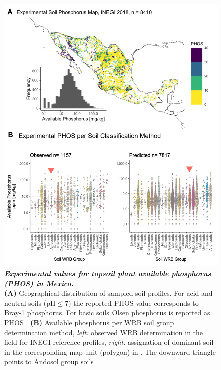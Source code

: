\begin{figure}[!ht]
\centering
\includegraphics[width=0.9\linewidth]{Chapter-2/figs/obeserved_PHOS.png}
\caption[Experimental values for topsoil plant available phosphorus (PHOS) in Mexico]{\textit{\textbf{Experimental values for topsoil plant available phosphorus (PHOS) in Mexico.}} \\\hspace{\textwidth} 
\textbf{(A)} Geographical distribution of sampled soil profiles. For acid and neutral soils ($\text{pH} \leq 7$) the reported PHOS value corresponds to Bray-1 phosphorus. For basic soils Olsen phosphorus is reported as PHOS  \citep{paz-pellat2018}.
\textbf{(B)} Available phosphorus per WRB soil group determination method, \textit{left:} observed WRB determination in the field for INEGI reference profiles, \textit{right:} assignation of dominant soil in the corresponding map unit (polygon) in \citep{inegi2013}. The downward triangle points to Andosol group soils}
\label{fig::obeserved_PHOS}
\end{figure}
\clearpage

 

